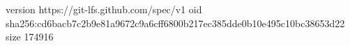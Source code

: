 version https://git-lfs.github.com/spec/v1
oid sha256:cd6bacb7c2b9e81a9672c9a6cff6800b217ec385dde0b10e495c10bc38653d22
size 174916
